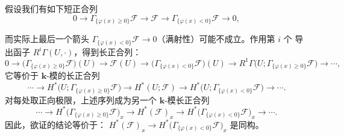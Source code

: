 \begin{wproof}[命题 10.7.1 的证明]
  假设我们有如下短正合列
  \begin{equation}\tag{10.40}
    0\to\Gamma_{\{\varphi(x)\ge0\}}\mathcal F\to\mathcal F
    \to\Gamma_{\{\varphi(x)<0\}}\mathcal F\to0,
  \end{equation}

  而实际上最后一个箭头
  $\Gamma_{\{\varphi(x)<0\}}\mathcal F\to0$（满射性）可能不成立。作用第 $i$ 个
  导出函子 $R^i\Gamma(U,\cdot)$，得到长正合列：
  \[
    0\to\bigl(\Gamma_{\{\varphi(x)\ge0\}}\mathcal F\bigr)(U)
    \to\mathcal F(U)\to\bigl(\Gamma_{\{\varphi(x)<0\}}\mathcal F\bigr)(U)
    \to R^1\Gamma\bigl(U;\Gamma_{\{\varphi(x)\ge0\}}\mathcal F\bigr)\to\cdots,
  \]
  它等价于 $\mathbf{k}$-模的长正合列
  \[
    \cdots\to H^*\bigl(U;\Gamma_{\{\varphi(x)\ge0\}}\mathcal F\bigr)
    \to H^*(U;\mathcal F)
    \to H^*\bigl(U;\Gamma_{\{\varphi(x)<0\}}\mathcal F\bigr)\to\cdots.
  \]
  对每处取正向极限，上述序列成为另一个 $\mathbf{k}$-模长正合列
  \begin{equation}\tag{10.41}
    \cdots\to H^*\bigl(\Gamma_{\{\varphi(x)\ge0\}}\mathcal F\bigr)_x
    \to H^*(\mathcal F)_x
    \to H^*\bigl(\Gamma_{\{\varphi(x)<0\}}\mathcal F\bigr)_x\to\cdots.
  \end{equation}
  因此，欲证的结论等价于：
  $H^*(\mathcal F)_x\to H^*\bigl(\Gamma_{\{\varphi(x)<0\}}\mathcal F\bigr)_x$
  是同构。


\end{wproof}
